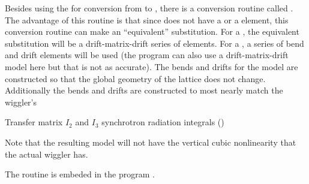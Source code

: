 Besides using the  for conversion
from \bmad to \mad, there is a \bmad conversion routine called
. 
The advantage of this routine is that since \mad does not have a
 or a  element, this conversion routine can
make an ``equivalent'' substitution. For a , the
equivalent substitution will be a drift-matrix-drift series of
elements. For a , a series of bend and drift elements will
be used (the program can also use a drift-matrix-drift model here but
that is not as accurate). The bends and drifts for the 
model are constructed so that the global geometry of the lattice does
not change. Additionally the bends and drifts are constructed to most
nearly match the wiggler's
\begin{example}
  Transfer matrix
  $I_2$ and $I_3$ synchrotron radiation integrals ()
\end{example}
Note that the resulting model will not have the vertical cubic
nonlinearity that the actual wiggler has.

The  routine is embeded in the program
.

